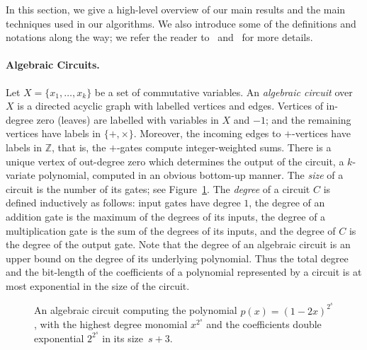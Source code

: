 
In this section, we give a high-level overview of our main results and the main techniques used in our  algorithms.  
 We also introduce some of the  definitions and notations along the
way; we refer the reader to~ and~\cite{stewart2001algebraic, StewartBook} for more details. 

\paragraph{Algebraic Circuits.}
Let $X=\{x_1,\ldots,x_k\}$ be a set of commutative variables.
An \emph{algebraic circuit}  over~$X$ is a directed acyclic graph  with labelled vertices and edges. Vertices of in-degree zero (leaves) are labelled with variables in $X$ and $-1$; and the remaining vertices have labels in $\{+,\times\}$. Moreover, the incoming edges to $+$-vertices have labels in $\mathbb{Z}$, that is, the $+$-gates compute integer-weighted sums. There is a unique vertex of out-degree zero which determines the output of the circuit, a $k$-variate polynomial, computed in an obvious bottom-up manner.
%
The \emph{size} of a circuit is the number of its gates; see Figure~\ref{fig:circuit}.
The \emph{degree} of a circuit $C$ is defined inductively as follows: input gates have degree $1$, the degree of an addition gate is the maximum of the degrees of its inputs, the degree of a multiplication gate is the sum of the degrees of its inputs, and the degree of $C$ is the degree of the output gate. Note that the degree of an algebraic circuit is an upper bound on the degree of its underlying polynomial.
Thus the total degree and the bit-length of the coefficients of a polynomial represented by a circuit is at most exponential in the size of the circuit.


\begin{figure}[t]
\begin{center}	
	\end{center}
	\caption{An  algebraic circuit 
	 computing   the polynomial $p(x)=(1-2x)^{2^s}$, with the highest degree monomial $x^{2^s}$ and the coefficients double exponential $2^{2^s}$ in its size~$s+3$.}\label{fig:circuit}
\end{figure}

